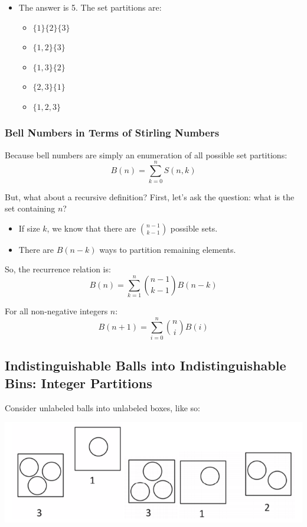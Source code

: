 \documentclass[letterpaper]{article}
\begin{document}
\begin{itemize}
    \item The answer is 5. The set partitions are:
    \begin{itemize}
        \item $\{1\} \{2\} \{3\}$
        \item $\{1, 2\} \{3\}$
        \item $\{1, 3\} \{2\}$
        \item $\{2, 3\} \{1\}$
        \item $\{1, 2, 3\}$
    \end{itemize}
\end{itemize}

\subsubsection{Bell Numbers in Terms of Stirling Numbers}
Because bell numbers are simply an enumeration of all possible set partitions:
\[B(n) = \sum_{k = 0}^n S(n, k)\]

But, what about a recursive definition? First, let's ask the question: what is the set containing $n$?
\begin{itemize}
    \item If size $k$, we know that there are $\binom{n - 1}{k - 1}$ possible sets.
    \item There are $B(n - k)$ ways to partition remaining elements. 
\end{itemize}
So, the recurrence relation is:
\[B(n) = \sum_{k = 1}^n \binom{n - 1}{k - 1}B(n - k)\]

\begin{theorem}{}{}
    For all non-negative integers $n$:
    \[B(n + 1) = \sum_{i = 0}^{n} \binom{n}{i} B(i)\]
\end{theorem}

\subsection{Indistinguishable Balls into Indistinguishable Bins: Integer Partitions}
Consider unlabeled balls into unlabeled boxes, like so:
\begin{center}
    \includegraphics[scale=0.8]{img/i_ball_i_bin.PNG}
\end{center}
\end{document}
